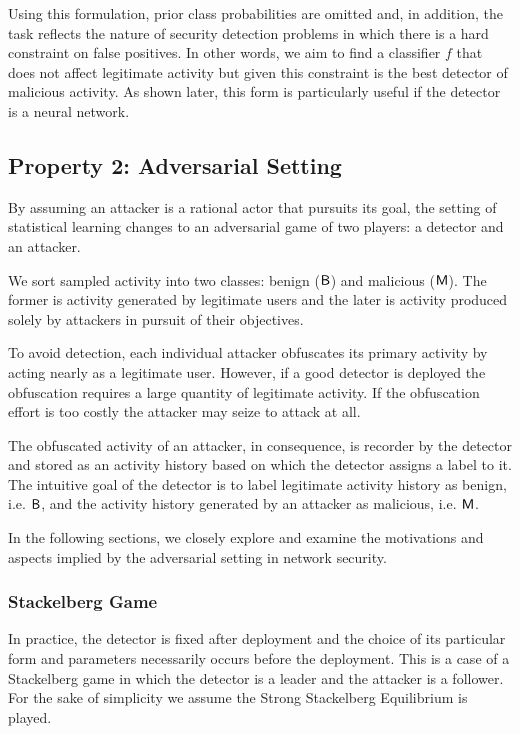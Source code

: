 Using this formulation, prior class probabilities are omitted and, in addition, the task reflects the nature of security detection problems in which there is a hard constraint on false positives. In other words, we aim to find a classifier $f$ that does not affect legitimate activity but given this constraint is the best detector of malicious activity. As shown later, this form is particularly useful if the detector is a neural network.

\subsection{Property 2: Adversarial Setting}
By assuming an attacker is a rational actor that pursuits its goal, the setting of statistical learning changes to an adversarial game of two players: a detector and an attacker.

We sort sampled activity into two classes: benign ($\mathsf{B}$) and malicious ($\mathsf{M}$). The former is activity generated by legitimate users and the later is activity produced solely by attackers in pursuit of their objectives.

To avoid detection, each individual attacker obfuscates its primary activity by acting nearly as a legitimate user. However, if a good detector is deployed the obfuscation requires a large quantity of legitimate activity. If the obfuscation effort is too costly the attacker may seize to attack at all.

The obfuscated activity of an attacker, in consequence, is recorder by the detector and stored as an activity history based on which the detector assigns a label to it. The intuitive goal of the detector is to label legitimate activity history as benign, i.e. $\mathsf{B}$, and the activity history generated by an attacker as malicious, i.e. $\mathsf{M}$.

In the following sections, we closely explore and examine the motivations and aspects implied by the adversarial setting in network security.

\subsubsection{Stackelberg Game}
In practice, the detector is fixed after deployment and the choice of its particular form and parameters necessarily occurs before the deployment. This is a case of a Stackelberg game \cite{stackelberg_games} in which the detector is a leader and the attacker is a follower. For the sake of simplicity we assume the Strong Stackelberg Equilibrium is played.

